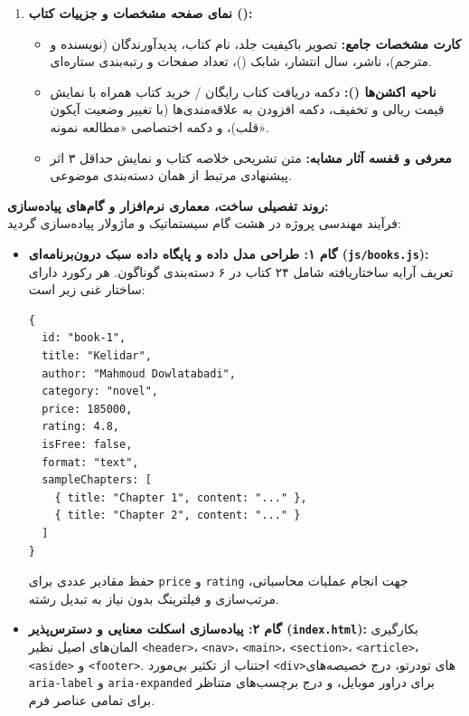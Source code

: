 \documentclass[12pt]{exam}
\begin{document}
\begin{questions}
\begin{enumerate}
    \item \textbf{نمای صفحه مشخصات و جزییات کتاب ():}
    \begin{itemize}
        \item \textbf{کارت مشخصات جامع:} تصویر باکیفیت جلد، نام کتاب، پدیدآورندگان (نویسنده و مترجم)، ناشر، سال انتشار، شابک ()، تعداد صفحات و رتبه‌بندی ستاره‌ای.
        \item \textbf{ناحیه اکشن‌ها ():} دکمه دریافت کتاب رایگان / خرید کتاب همراه با نمایش قیمت ریالی و تخفیف، دکمه افزودن به علاقه‌مندی‌ها (با تغییر وضعیت آیکون قلب)، و دکمه اختصاصی «مطالعه نمونه».
        \item \textbf{معرفی و قفسه آثار مشابه:} متن تشریحی خلاصه کتاب و نمایش حداقل ۳ اثر پیشنهادی مرتبط از همان دسته‌بندی موضوعی.
    \end{itemize}
\end{enumerate}



\question
\textbf{روند تفصیلی ساخت، معماری نرم‌افزار و گام‌های پیاده‌سازی:}
\\
فرآیند مهندسی پروژه در هشت گام سیستماتیک و ماژولار پیاده‌سازی گردید:
\begin{itemize}
    \item \textbf{گام ۱: طراحی مدل داده و پایگاه داده سبک درون‌برنامه‌ای (\texttt{js/books.js}):}
    تعریف آرایه ساختاریافته شامل ۲۴ کتاب در ۶ دسته‌بندی گوناگون. هر رکورد دارای ساختار غنی زیر است:
\begin{latin}
\begin{lstlisting}
{
  id: "book-1",
  title: "Kelidar",
  author: "Mahmoud Dowlatabadi",
  category: "novel",
  price: 185000,
  rating: 4.8,
  isFree: false,
  format: "text",
  sampleChapters: [
    { title: "Chapter 1", content: "..." },
    { title: "Chapter 2", content: "..." }
  ]
}
\end{lstlisting}
\end{latin}
    حفظ مقادیر عددی برای \texttt{price} و \texttt{rating} جهت انجام عملیات محاسباتی، مرتب‌سازی و فیلترینگ بدون نیاز به تبدیل رشته.

    \item \textbf{گام ۲: پیاده‌سازی اسکلت معنایی و دسترس‌پذیر (\texttt{index.html}):}
    بکارگیری المان‌های اصیل  نظیر \texttt{<header>}، \texttt{<nav>}، \texttt{<main>}، \texttt{<section>}، \texttt{<article>}، \texttt{<aside>} و \texttt{<footer>}. اجتناب از تکثیر بی‌مورد \texttt{<div>}های تودرتو، درج خصیصه‌های \texttt{aria-label} و \texttt{aria-expanded} برای دراور موبایل، و درج برچسب‌های متناظر برای تمامی عناصر فرم.


\end{itemize}
\end{questions}
\end{document}
